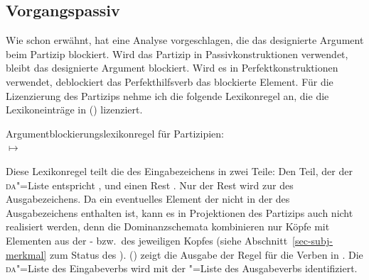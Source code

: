 \subsection{Vorgangspassiv}
\label{sec-agentive-passive-da}

Wie schon erwähnt, hat \citet{Haider86} eine Analyse vorgeschlagen, die das designierte Argument
beim Partizip blockiert. Wird das Partizip in Passivkonstruktionen verwendet, bleibt
das designierte Argument blockiert. Wird es in Perfektkonstruktionen verwendet,
deblockiert das Perfekthilfsverb das blockierte Element. Für die Lizenzierung
des Partizips nehme ich die folgende Lexikonregel an, die die Lexikoneinträge in () 
lizenziert.


\eas
\label{lr-da-reduction}%
Argumentblockierungslexikonregel für Partizipien:\\[1mm]
 $\mapsto$
\zs

\noindent
Diese Lexikonregel teilt die \argstl des Eingabezeichens in zwei Teile: Den Teil,
der der \textsc{da}"=Liste entspricht , und einen Rest .
Nur der Rest wird zur \argstl des Ausgabezeichens. 
Da ein eventuelles Element der \daliste nicht in der \argstl des Ausgabezeichens enthalten ist,
kann es in Projektionen des Partizips auch nicht realisiert werden, denn die Dominanzschemata
kombinieren nur Köpfe mit Elementen aus der \comps- bzw.\ \sprl des jeweiligen Kopfes (siehe
Abschnitt~\ref{sec-subj-merkmal} zum Status des \subjms).
() zeigt die Ausgabe der Regel für die Verben in .
Die \textsc{da}"=Liste des Eingabeverbs wird mit der {\subj}"=Liste des Ausgabeverbs
identifiziert. 

